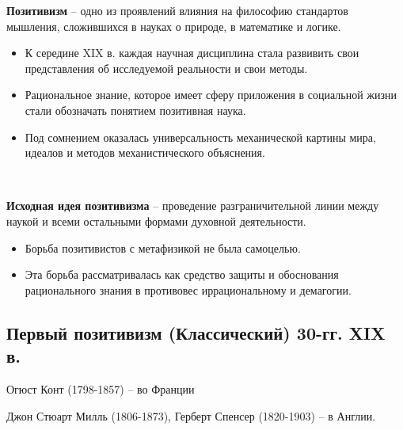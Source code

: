 \documentclass[main.tex]{subfiles}
\begin{document}
{\parindent0pt
\textbf{Позитивизм} -- одно из проявлений влияния на философию стандартов мышления, сложившихся в науках о природе, в математике и логике.
\begin{itemize}[nosep,leftmargin=0.5cm]
\item К середине XIX в. каждая научная дисциплина стала развивить свои представления об исследуемой реальности и свои методы.
\item Рациональное знание, которое имеет сферу приложения в социальной жизни стали обозначать понятием позитивная наука.
\item Под сомнением оказалась универсальность механической картины мира, идеалов и методов механистического объяснения.
\end{itemize}
}
\ 

{\parindent0pt
\textbf{Исходная идея позитивизма} -- проведение разграничительной линии между наукой и всеми остальными формами духовной деятельности.
\begin{itemize}[nosep,leftmargin=0.5cm]
\item Борьба позитивистов с метафизикой не была самоцелью.
\item Эта борьба рассматривалась как средство защиты и обоснования рационального знания в противовес иррациональному и демагогии.
\end{itemize}
}



\subsection{Первый позитивизм (Классический) 30-гг. XIX в.}

{\parindent0pt
Огюст Конт (1798-1857) -- во Франции

Джон Стюарт Милль (1806-1873), Герберт Спенсер (1820-1903) -- в Англии.
}
\\
\end{document}
